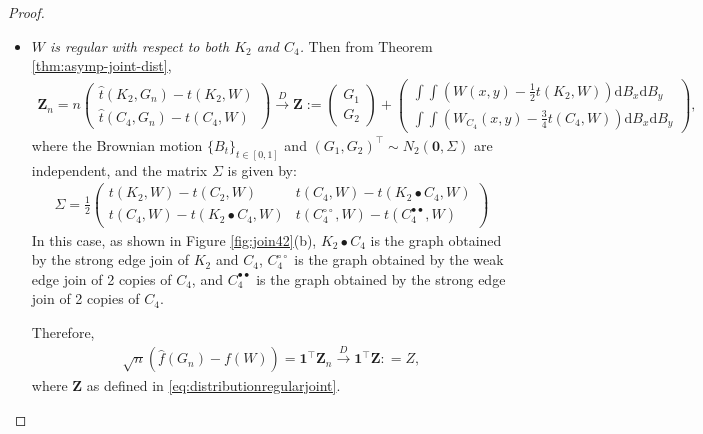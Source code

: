 \documentclass[11pt,reqno]{amsart}
\numberwithin{equation}{section}
\theoremstyle{definition}
\begin{document}
\begin{proof}
\begin{itemize}
\item[{\it Case} 4:] {\it $W$ is regular with respect to both $K_{2}$ and $C_{4}$.} Then from Theorem \ref{thm:asymp-joint-dist}, 
\begin{align}\label{eq:distributionregularjoint}
    \bm{Z}_n = n
    \begin{pmatrix}
    \hat{t}(K_{2}, G_n) - t(K_{2},W)\\
    \hat{t}(C_{4}, G_n) - t(C_{4},W)
    \end{pmatrix} 
    \overset{D}{\rightarrow} \bm Z := 
    \begin{pmatrix}
    G_{1}\\
    G_{2}
    \end{pmatrix} +
    \begin{pmatrix}
    \int\int \left(W(x, y) - \frac{1}{2}t(K_{2},W) \right) \mathrm{d}B_{x} \mathrm{d}B_{y}\\
    \int\int \left(W_{C_{4}}(x, y) - \frac{3}{4}t(C_{4},W) \right) \mathrm{d}B_{x} \mathrm{d}B_{y}
    \end{pmatrix} , 
\end{align}
where the Brownian motion $\{B_t\}_{t \in [0, 1]}$ and $(G_{1}, G_{2})^{\top}
\sim N_2( \bm 0, \Sigma)$ are independent, and the matrix $\Sigma$ is given by: 
\begin{align*}
    \Sigma = 
    \frac{1}{2}\begin{pmatrix}
    t(K_{2},W) - t(C_{2},W) & t(C_{4},W) - t(K_{2} \bullet C_{4} ,W)\\
    t(C_{4},W) - t( K_{2} \bullet C_{4},W) & t(C_{4}^{\circ \circ},W) - t(C_{4}^{\bullet \bullet},W)  
    \end{pmatrix} 
    \end{align*}
  In this case, as shown in Figure \ref{fig:join42}(b), $K_{2} \bullet C_{4}$ is the graph obtained by the strong edge join of $K_2$ and $C_4$, 
 $C_{4}^{\circ \circ}$ is the graph obtained by the weak edge join of 2 copies of $C_4$, and $C_{4}^{\bullet \bullet}$ is the graph obtained by the strong edge join of 2 copies of $C_4$. 

Therefore, 
\begin{align}\label{eq:distributionregular}
\sqrt{n}(\hat f(G_n) - f(W)) = \bm{1}^\top \bm{Z}_{n} \stackrel{D} \rightarrow \bm{1}^\top \bm{Z} : = Z, 
\end{align}
where $\bm{Z}$ as defined in \eqref{eq:distributionregularjoint}. 
\end{itemize}

\end{proof}
\end{document}

